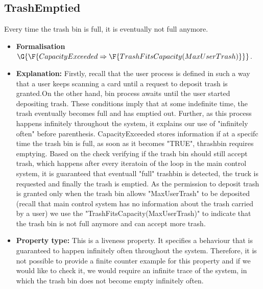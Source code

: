 \subsection{TrashEmptied}
Every time the trash bin is full, it is eventually not full anymore.
\begin{itemize}
	\item \textbf{Formalisation} $\G{\F{CapacityExceeded \Rightarrow \F{TrashFitsCapacity(MaxUserTrash)}}}$.
	\item \textbf{Explanation:} Firstly, recall that the user process is defined in such a way that a user keeps scanning a card until a request to deposit trash is granted.On the other hand, bin process awaits until the user started depositing trash. These conditions imply that at some indefinite time, the trash eventually becomes full and has emptied out. Further, as this process happens infinitely throughout the system, it explains our use of "infinitely often" before parenthesis. CapacityExceeded stores information if at a specifc time the trash bin is full, as soon as it becomes "TRUE", thrashbin requires emptying. Based on the check verifying if the trash bin should still accept trash, which happens after every iteratoin of the loop in the main control system, it is guaranteed that eventuall
	      "full" trashbin is detected, the truck is requested and finally the trash is emptied. As the permission to deposit trash is granted only when the trash bin allows "MaxUserTrash" to be deposited (recall that main control system has no information about the trash carried by a user) we use the "TrashFitsCapacity(MaxUserTrash)" to indicate that the trash bin is not full anymore and can accept more trash.
	\item \textbf{Property type:} This is a liveness property. It specifies a behaviour that is guaranteed to happen infinitely often throughout the system. Therefore, it is not possible to provide a finite counter example for this property and if we would like to check it, we would require an infinite trace of the system, in which the trash bin does not become empty infinitely often.
\end{itemize}
